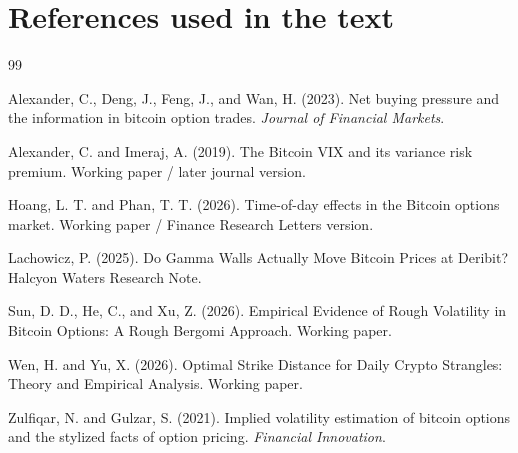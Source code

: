 \documentclass[11pt,a4paper]{article}
\begin{document}
\normalsize
\section{References used in the text}

\begin{thebibliography}{99}

Alexander, C., Deng, J., Feng, J., and Wan, H. (2023).
Net buying pressure and the information in bitcoin option trades.
\emph{Journal of Financial Markets}.

Alexander, C. and Imeraj, A. (2019).
The Bitcoin VIX and its variance risk premium.
Working paper / later journal version.

Hoang, L. T. and Phan, T. T. (2026).
Time-of-day effects in the Bitcoin options market.
Working paper / Finance Research Letters version.

Lachowicz, P. (2025).
Do Gamma Walls Actually Move Bitcoin Prices at Deribit?
Halcyon Waters Research Note.

Sun, D. D., He, C., and Xu, Z. (2026).
Empirical Evidence of Rough Volatility in Bitcoin Options: A Rough Bergomi Approach.
Working paper.

Wen, H. and Yu, X. (2026).
Optimal Strike Distance for Daily Crypto Strangles: Theory and Empirical Analysis.
Working paper.

Zulfiqar, N. and Gulzar, S. (2021).
Implied volatility estimation of bitcoin options and the stylized facts of option pricing.
\emph{Financial Innovation}.

\end{thebibliography}
\end{document}
